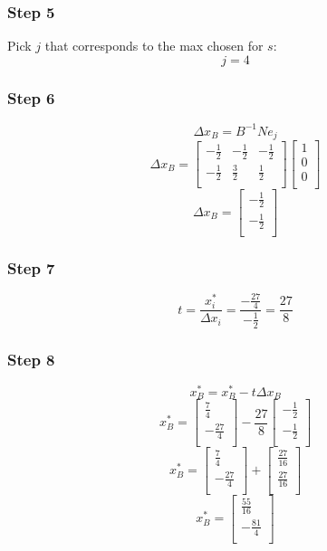 \documentclass[14pt]{extarticle}
\begin{document}
\subsubsection*{Step 5}
Pick $j$ that corresponds to the max chosen for $s$:
\[
    j = 4
\]

\subsubsection*{Step 6}
\[
    \Delta x_B = B^{-1}N e_j
\]
\[
    \Delta x_B =
    \begin{bmatrix}
        -\frac{1}{2} & -\frac{1}{2} & -\frac{1}{2} \\
        -\frac{1}{2} & \frac{3}{2} & \frac{1}{2} \\
    \end{bmatrix}
    \begin{bmatrix}
        1 \\
        0 \\
        0 \\
    \end{bmatrix}
\]
\[
    \Delta x_B =
    \begin{bmatrix}
        -\frac{1}{2} \\
        -\frac{1}{2} \\
    \end{bmatrix}
\]

\subsubsection*{Step 7}
\[
    t = \frac{x^*_i}{\Delta x_i} = \frac{-\frac{27}{4}}{-\frac{1}{2}} = \frac{27}{8}
\]

\subsubsection*{Step 8}
\[
    x^*_B = x^*_B - t \Delta x_B
\]
\[
    x^*_B = \begin{bmatrix}
        \frac{7}{4} \\
        -\frac{27}{4} \\
    \end{bmatrix}
    - \frac{27}{8} \begin{bmatrix}
        -\frac{1}{2} \\
        -\frac{1}{2} \\
    \end{bmatrix}
\]
\[
    x^*_B = \begin{bmatrix}
        \frac{7}{4} \\
        -\frac{27}{4} \\
    \end{bmatrix}
    + \begin{bmatrix}
        \frac{27}{16} \\
        \frac{27}{16} \\
    \end{bmatrix}
\]
\[
    x^*_B = \begin{bmatrix}
        \frac{55}{16} \\
        -\frac{81}{4} \\
    \end{bmatrix}
\]
\end{document}
